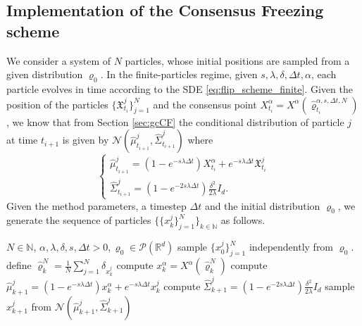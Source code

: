 \documentclass[reqno]{amsart}
\numberwithin{algorithm}{section}
\newcommand{\Xalpha}{{X^\alpha}}
\newcommand{\Xf}{{\mathfrak{X}}}
\begin{document}
{\subsection{Implementation of the Consensus Freezing scheme}\label{sec:impCF}
We consider a system of $N$ particles, whose initial positions are sampled from a given distribution $\varrho_0$. In the finite-particles regime, given $s,\lambda,\delta,\Delta t, \alpha$, each particle evolves in time according to the SDE \eqref{eq:flip_scheme_finite}. Given the position of the particles $\{\Xf^j_{t_i}\}_{j=1}^N$ and the consensus point $X_{t_i}^\alpha = \Xalpha(\widehat\varrho^{\alpha,s,\Delta t,N}_{t_i})$, we know that from  Section \ref{sec:gcCF}   the conditional distribution of particle $j$ at time $t_{i+1}$ is given by $\mathcal N\left(\widehat\mu^j_{t_{i+1}}, \widehat \Sigma^j_{t_{i+1}}\right)$ where
\begin{equation}\label{iterative}
    \begin{cases}
        \widehat\mu^j_{t_{i+1}}=(1-e^{-s\lambda\Delta t})X^\alpha_{t_i}+e^{-s\lambda\Delta t}\Xf^j_{t_i}\\
        \widehat\Sigma_{t_{i+1}}^j = (1-e^{-2s\lambda\Delta t})\frac{\delta^2}{2\lambda}I_d.
    \end{cases}
\end{equation}
Given the method parameters, a timestep $\Delta t$ and the initial distribution $\varrho_0$, we generate the sequence of particles $\{\{x^j_k\}_{j=1}^N\}_{k\in\mathbb N}$ as follows.
\begin{algorithm}
\caption{Consensus Freezing}\label{alg:CF}
\begin{algorithmic}[1]
\REQUIRE $N\in\mathbb N$, $\alpha,\lambda,\delta,s,\Delta t>0, \varrho_0\in\mathcal{P}(\mathbb{R}^d)$
\STATE sample $\{x^j_0\}_{j=1}^N$ independently from $\varrho_0.$ 
    \STATE define  $\widehat \varrho_k^N = \frac{1}{N}\sum_{j=1}^N\delta_{x^j_k}$
    \STATE compute $x^\alpha_k = X^\alpha(\widehat \varrho_k^N)$
        \STATE compute $\widehat\mu^j_{k+1}=(1-e^{-s\lambda\Delta t})x^\alpha_k+e^{-s\lambda\Delta t}x^j_k$
        \STATE compute $\widehat\Sigma_{k+1}^j = (1-e^{-2s\lambda\Delta t})\frac{\delta^2}{2\lambda}I_d$
        \STATE sample $x^j_{k+1}$ from $\mathcal N\left(\widehat \mu^j_{k+1},\widehat\Sigma^j_{k+1}\right)$
    \ENDFOR
\ENDFOR
\end{algorithmic}
\end{algorithm}


}
\end{document}
